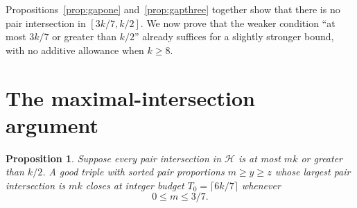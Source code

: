 \documentclass[11pt]{article}
\numberwithin{equation}{section}
\newtheorem{proposition}[theorem]{Proposition}
\theoremstyle{definition}
\theoremstyle{remark}
\newcommand{\HH}{\mathcal H}
\begin{document}
Propositions~\ref{prop:gapone} and~\ref{prop:gapthree} together show that
there is no pair intersection in $[3k/7,k/2]$. We now prove that the
weaker condition ``at most $3k/7$ or greater than $k/2$'' already suffices
for a slightly stronger bound, with no additive allowance when $k\ge8$.

\section{The maximal-intersection argument}\label{sec:finish}
\begin{proposition}\label{prop:localfinish}
Suppose every pair intersection in $\HH$ is at most $mk$ or greater
than $k/2$. A good triple with sorted pair proportions $m\ge y\ge z$
whose largest pair intersection is $mk$ closes at integer budget
$T_0=\lceil6k/7\rceil$ whenever
\begin{equation}\label{eq:finishdomain}
 0\le m\le3/7.
\end{equation}
\end{proposition}
\end{document}
